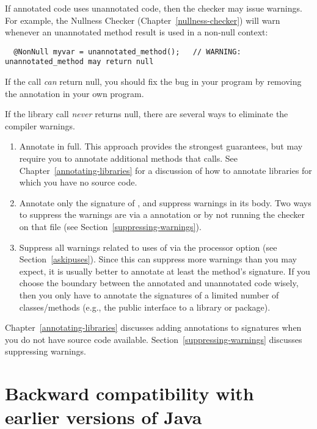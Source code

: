 If annotated code uses unannotated code, then the checker may issue
warnings.  For example, the Nullness Checker (Chapter~\ref{nullness-checker}) will
warn whenever an unannotated method result is used in a non-null context:

\begin{Verbatim}
  @NonNull myvar = unannotated_method();   // WARNING: unannotated_method may return null
\end{Verbatim}

If the call \emph{can} return null, you should fix the bug in your program by
removing the  annotation in your own program.

If the library call \emph{never} returns null,
there are several ways to eliminate the compiler warnings.
\begin{enumerate}
\item Annotate  in full.  This approach provides
  the strongest guarantees, but may require you to annotate additional
  methods that  calls.  See
  Chapter~\ref{annotating-libraries} for a discussion of how to annotate
  libraries for which you have no source code.
\item Annotate only the signature of , and
  suppress warnings in its body.  Two ways to suppress the warnings are via a
   annotation or by not running the checker on that
  file (see Section~\ref{suppressing-warnings}).
\item Suppress all warnings related to uses of 
  via the  processor option
  (see Section~\ref{askipuses}).
  Since this can suppress more warnings than you may expect,
  it is usually better to annotate at least the method's signature.  If you
  choose the boundary between the annotated and unannotated code wisely,
  then you only have to annotate the signatures of a limited number of
  classes/methods
  (e.g., the public interface to a library or package).

\end{enumerate}

Chapter~\ref{annotating-libraries} discusses adding annotations to
signatures when you do not have source code available.
Section~\ref{suppressing-warnings} discusses suppressing warnings.


\section{Backward compatibility with earlier versions of Java\label{backward-compatibility}}

